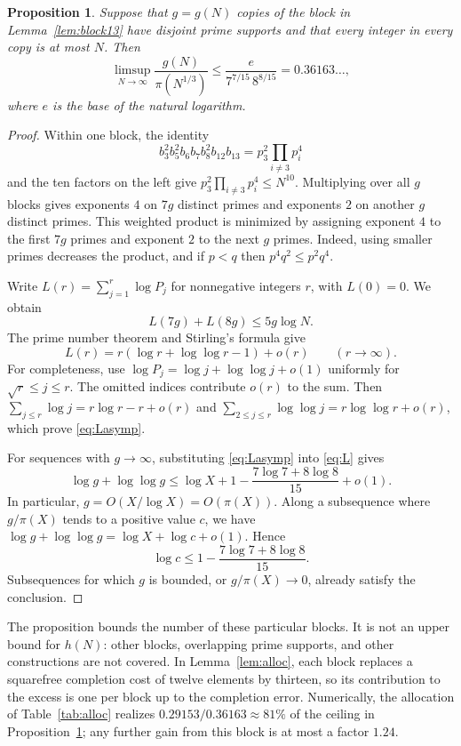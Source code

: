 \documentclass[11pt]{article}
\numberwithin{equation}{section}
\newtheorem{proposition}[theorem]{Proposition}
\theoremstyle{remark}
\begin{document}
\begin{proposition}\label{prop:blockbound}
Suppose that $g=g(N)$ copies of the block in Lemma~\ref{lem:block13} have disjoint prime supports and that every integer in every copy is at most $N$. Then
\[
\limsup_{N\to\infty}\frac{g(N)}{\pi(N^{1/3})}\le\frac{e}{7^{7/15}\,8^{8/15}}=0.36163\ldots,
\]
where $e$ is the base of the natural logarithm.
\end{proposition}

\begin{proof}
Within one block, the identity
\[
b_3^2b_5^2b_6b_7b_8^2b_{12}b_{13}=p_3^2\prod_{i\ne3}p_i^4
\]
and the ten factors on the left give $p_3^2\prod_{i\ne3}p_i^4\le N^{10}$. Multiplying over all $g$ blocks gives exponents $4$ on $7g$ distinct primes and exponents $2$ on another $g$ distinct primes. This weighted product is minimized by assigning exponent $4$ to the first $7g$ primes and exponent $2$ to the next $g$ primes. Indeed, using smaller primes decreases the product, and if $p<q$ then $p^4q^2\le p^2q^4$.

Write $L(r)=\sum_{j=1}^r\log P_j$ for nonnegative integers $r$, with $L(0)=0$. We obtain
\begin{equation}\label{eq:L}
L(7g)+L(8g)\le5g\log N.
\end{equation}
The prime number theorem and Stirling's formula give
\begin{equation}\label{eq:Lasymp}
L(r)=r(\log r+\log\log r-1)+o(r)\qquad(r\to\infty).
\end{equation}
For completeness, use $\log P_j=\log j+\log\log j+o(1)$ uniformly for $\sqrt r\le j\le r$. The omitted indices contribute $o(r)$ to the sum. Then $\sum_{j\le r}\log j=r\log r-r+o(r)$ and $\sum_{2\le j\le r}\log\log j=r\log\log r+o(r)$, which prove \eqref{eq:Lasymp}.

For sequences with $g\to\infty$, substituting \eqref{eq:Lasymp} into \eqref{eq:L} gives
\[
\log g+\log\log g\le\log X+1-\frac{7\log7+8\log8}{15}+o(1).
\]
In particular, $g=O(X/\log X)=O(\pi(X))$. Along a subsequence where $g/\pi(X)$ tends to a positive value $c$, we have $\log g+\log\log g=\log X+\log c+o(1)$. Hence
\[
\log c\le1-\frac{7\log7+8\log8}{15}.
\]
Subsequences for which $g$ is bounded, or $g/\pi(X)\to0$, already satisfy the conclusion.
\end{proof}

The proposition bounds the number of these particular blocks. It is not an upper bound for $h(N)$: other blocks, overlapping prime supports, and other constructions are not covered. In Lemma~\ref{lem:alloc}, each block replaces a squarefree completion cost of twelve elements by thirteen, so its contribution to the excess is one per block up to the completion error. Numerically, the allocation of Table~\ref{tab:alloc} realizes $0.29153/0.36163\approx81\%$ of the ceiling in Proposition~\ref{prop:blockbound}; any further gain from this block is at most a factor $1.24$.
\end{document}
